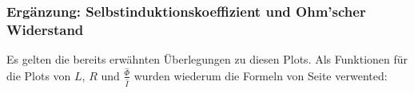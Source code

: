 {	\begin{minipage}[t]{0.33\textwidth}
        \vspace{0pt}
        
	\end{minipage}%
	\begin{minipage}[t]{0.67\textwidth}
        \vspace{0pt}
        \resizebox{.95\textwidth}{!}{}
        \label{fig:st:freq:approx2}
	\end{minipage}


	\begin{minipage}[t]{0.33\textwidth}
        \vspace{0pt}
        \subsubsection{Erg\"anzung: Selbstinduktionskoeffizient und Ohm'scher Widerstand}
        \label{sec:ausw:subsec:hohlz:st:subsubsec:LR}

        Es   gelten  die   bereits   erw\"ahnten   \"Uberlegungen  zu   diesen
        Plots.    Als  Funktionen   f\"ur   die  Plots   von   $L$,  $R$   und
        $\frac{\hat{\Phi}}{\hat{I}}$  wurden wiederum  die  Formeln von  Seite
        \pageref{eq:hohlzylinder:phiNormExact} verwented:


\end{minipage}}
